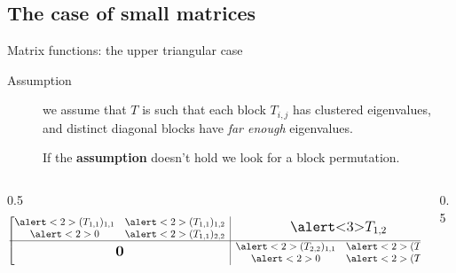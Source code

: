 \documentclass[aspectratio=169,xcolor=dvipsnames]{beamer}
\newcommand{\bigzero}{\mbox{\normalfont\Large\bfseries 0}}
\newcommand{\rvline}{\hspace*{-\arraycolsep}\vline\hspace*{-\arraycolsep}}
\begin{document}
\subsection{The case of small matrices}

\begin{frame}{Matrix functions: the upper triangular case}
\begin{description}
	\item[Assumption] we assume that $T$ is such that each block $T_{i,j}$ has \alert{clustered eigenvalues}, and distinct diagonal blocks have \emph{far enough} eigenvalues. 
	\item[\faExclamationCircle] If the \textbf{assumption} doesn't hold we look for a block permutation.
\end{description}
\begin{columns}
\begin{column}{0.5\columnwidth}
\[
\begin{bmatrix}
\begin{matrix}
\alert<2>{(T_{1,1})_{1,1}} & \alert<2>{(T_{1,1})_{1,2}} \\
\alert<2>{0} & \alert<2>{(T_{1,1})_{2,2}}
\end{matrix}
& \rvline & \mbox{\normalfont\Large \alert<3>{$T_{1,2}$} } \\
\hline
\bigzero & \rvline &
\begin{matrix}
\alert<2>{(T_{2,2})_{1,1}} & \alert<2>{(T_{2,2})_{1,2}} \\
\alert<2>{0} & \alert<2>{(T_{2,2})_{2,2}}
\end{matrix}
\end{bmatrix}
\]
\end{column}
\begin{column}{0.5\columnwidth}
\end{column}
\end{columns}
\end{frame}
\end{document}
